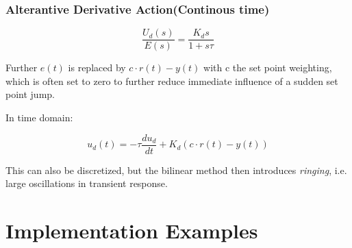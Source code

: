 \begin{frame}
	\frametitle{Alterantive Derivative Action(Continous time)}
	\begin{equation*}
		\frac{U_d(s)}{E(s)} = \frac{K_d s}{1+s\tau}
	\end{equation*}
	
	Further $e(t)$ is replaced by $c\cdot r(t)-y(t)$ with c the set point weighting, which is often set to zero to further reduce immediate influence of a sudden set point jump. 
	
	In time domain:
	
	\begin{equation*}
		u_d(t) = -\tau\frac{du_d}{dt} + K_d(c\cdot r(t)-y(t))
	\end{equation*}
	
	This can also be discretized, but the bilinear method then introduces \emph{ringing}, i.e. large oscillations in transient response.
\end{frame}
\section{Implementation Examples}

